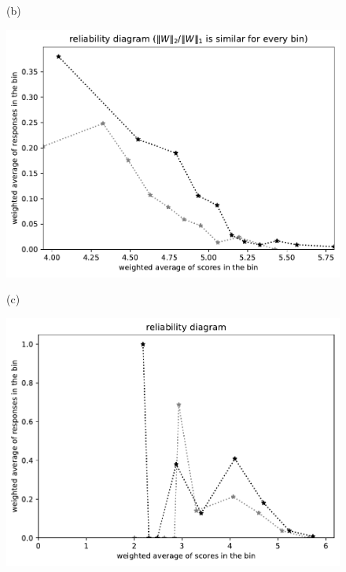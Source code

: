 \documentclass{article}
\newlength{\vertsep}
\newlength{\imsize}
\begin{document}
\begin{figure}
\begin{centering}
(b)
\parbox{\imsize}{\includegraphics[width=\imsize]
{../codes/weighted/County_of_San_Francisco_vs_Kern-LNGI/equierrs10.pdf}}
\quad\quad
(c)
\parbox{\imsize}{\includegraphics[width=\imsize]
{../codes/weighted/County_of_San_Francisco_vs_Kern-LNGI/equiscores10.pdf}}

\vspace{\vertsep}


\end{centering}
\end{figure}
\end{document}
